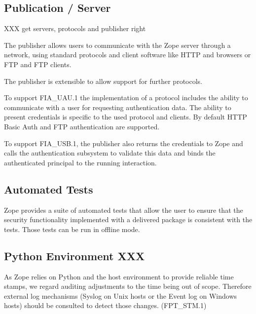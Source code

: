 \documentclass[10pt,a4paper,english]{article}
\begin{document}
\subsection*{Publication / Server}

XXX get servers, protocols and publisher right

The publisher allows users to communicate with the Zope server through a
network, using standard protocols and client software like HTTP and browsers or
FTP and FTP clients.

The publisher is extensible to allow support for further protocols.

To support FIA{\_}UAU.1 the implementation of a protocol includes the ability to
communicate with a user for requesting authentication data. The ability to
present credentials is specific to the used protocol and clients. By default
HTTP Basic Auth and FTP authentication are supported.

To support FIA{\_}USB.1, the publisher also returns the credentials to Zope and
calls the authentication subsystem to validate this data and binds the
authenticated principal to the running interaction.



\hypertarget{automated-tests}{}
\subsection*{Automated Tests}

Zope provides a suite of automated tests that allow the user to ensure that the
security functionality implemented with a delivered package is consistent with
the tests. Those tests can be run in offline mode.



\hypertarget{python-environment-xxx}{}
\subsection*{Python Environment XXX}

As Zope relies on Python and the host environment to provide reliable time
stamps, we regard auditing adjustments to the time being out of scope.
Therefore external log mechanisms (Syslog on Unix hosts or the Event log on
Windows hosts) should be consulted to detect those changes. (FPT{\_}STM.1)
\end{document}
